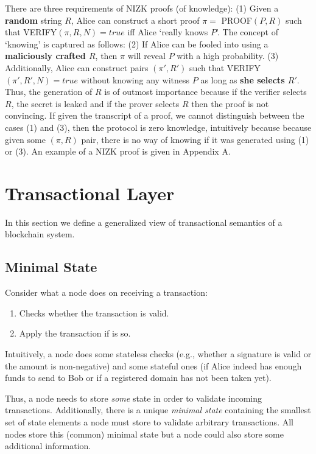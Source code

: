\documentclass[]{report}   %
\begin{document}
\begin{enumerate}
	There are three requirements of NIZK proofs (of knowledge): (1) Given a \textbf{random} string $R$, Alice can construct a short proof $\pi=$ PROOF$(P, R)$ such that VERIFY$(\pi, R, N)=true$ iff Alice `really knows $P$'. The concept of `knowing' is captured as follows: (2) If Alice can be fooled into using a \textbf{maliciously crafted $R$}, then $\pi$ will reveal $P$ with a high probability. (3) Additionally, Alice can construct pairs $(\pi', R')$ such that VERIFY$(\pi', R', N) = true$ without knowing any witness $P$ as long as \textbf{she selects $R'$}. Thus, the generation of $R$ is of outmost importance because if the verifier selects $R$, the secret is leaked and if the prover selects $R$ then the proof is not convincing. If given the transcript of a proof, we cannot distinguish between the cases (1) and (3), then the protocol is zero knowledge, intuitively because because given some $(\pi, R)$ pair, there is no way of knowing if it was generated using (1) or (3). An example of a NIZK proof is given in Appendix A.
\end{enumerate}



\section{Transactional Layer}

In this section we define a generalized view of transactional semantics of a blockchain system. %

\subsection{Minimal State}     %
	Consider what a node does on receiving a transaction:

    \begin{enumerate}
		\item Checks whether the transaction is valid.
		\item Apply the transaction if is so.
    \end{enumerate}

	Intuitively, a node does some stateless checks (e.g., whether a signature is valid or the amount is non-negative) and some stateful ones (if Alice indeed has enough funds to send to Bob or if a registered domain has not been taken yet). 

	Thus, a node needs to store {\em some} state in order to validate incoming transactions. Additionally, there is a unique \textit{minimal state} containing the smallest set of state elements a node must store to validate arbitrary transactions. All nodes store this (common) minimal state but a node could also store some additional information. %
\end{document}
